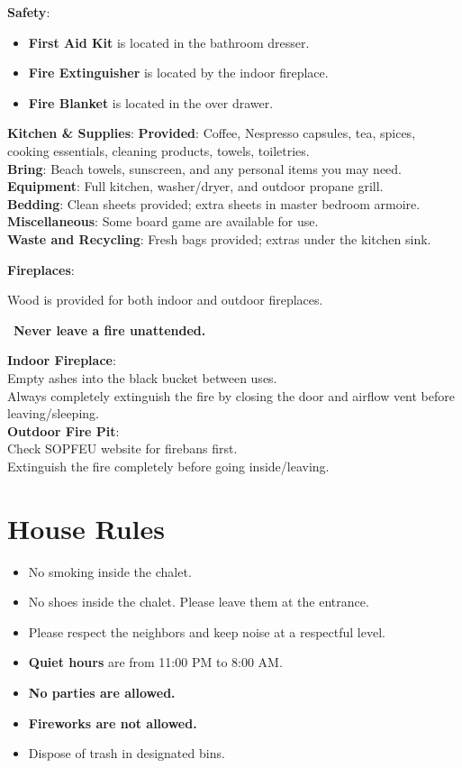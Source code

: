 \documentclass{article}
\newcommand*{\warnsign}{\begin{LARGE}\texttwemoji{warning}\end{LARGE}}
\newcommand*{\subhead}[2]{\noindent\textbf{#1}: {#2}\vspace{1em}}
\newcommand*{\subsubhead}[2]{\noindent\textbf{#1}: {#2}\vspace{0.25em}}
\newcommand*{\warning}[1]{\warnsign \ \textbf{#1} \warnsign}
\begin{document}
\subhead{Safety} {
    \begin{itemize}
        \item \textbf{First Aid Kit} is located in the bathroom dresser.
        \item \textbf{Fire Extinguisher} is located by the indoor fireplace.
        \item \textbf{Fire Blanket} is located in the over drawer.
    \end{itemize}
}

\subhead{Kitchen \& Supplies}
{
    \newline\newline
    \subsubhead{Provided}{Coffee, Nespresso capsules, tea, spices, cooking essentials, cleaning products, towels, toiletries.}
    \\\subsubhead{Bring}{Beach towels, sunscreen, and any personal items you may need.}
    \\\subsubhead{Equipment}{Full kitchen, washer/dryer, and outdoor propane grill.}
    \\\subsubhead{Bedding}{Clean sheets provided; extra sheets in master bedroom armoire.}
    \\\subsubhead{Miscellaneous}{Some board game are available for use.}
    \\\subsubhead{Waste and Recycling}{Fresh bags provided; extras under the kitchen sink.}
}

\subhead{Fireplaces} {
    Wood is provided for both indoor and outdoor fireplaces.
    \\\warning{Never leave a fire unattended.}
    \newline\newline
    \subsubhead{Indoor Fireplace}{
        \\Empty ashes into the black bucket between uses.
        \\Always completely extinguish the fire by closing the door and airflow vent before leaving/sleeping.
    }
    \\\subsubhead{Outdoor Fire Pit}{
        \\Check SOPFEU website for firebans first.
        \\Extinguish the fire completely before going inside/leaving.
    }
}
\section{House Rules}
\begin{itemize}
    \item No smoking inside the chalet.
    \item No shoes inside the chalet. Please leave them at the entrance.
    \item Please respect the neighbors and keep noise at a respectful level.
    \item \textbf{Quiet hours} are from 11:00 PM to 8:00 AM.
    \item \textbf{No parties are allowed.}
    \item \textbf{Fireworks are not allowed.}
    \item Dispose of trash in designated bins.
\end{itemize}
\end{document}
